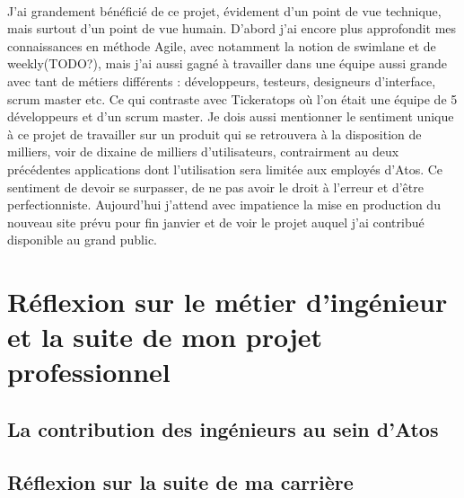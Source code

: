 \documentclass[12pt]{article}
\begin{document}
\begin {sloppypar}
\paragraph{}
J'ai grandement bénéficié de ce projet, évidement d'un point de vue technique, mais surtout d'un point 
de vue humain. D'abord j'ai encore plus approfondit mes connaissances en méthode Agile, avec notamment
la notion de swimlane et de weekly(TODO?), mais j'ai aussi gagné à travailler dans une équipe aussi grande avec 
tant de métiers différents : développeurs, testeurs, designeurs d'interface, scrum master etc. Ce qui contraste
avec Tickeratops où l'on était une équipe de 5 développeurs et d'un scrum master. Je dois aussi mentionner
le sentiment unique à ce projet de travailler sur un produit qui se retrouvera à la disposition de milliers,
voir de dixaine de milliers d'utilisateurs, contrairment au deux précédentes applications dont l'utilisation
sera limitée aux employés d'Atos. Ce sentiment de devoir se surpasser, de ne pas avoir le droit à l'erreur 
et d'être perfectionniste. Aujourd'hui j'attend avec impatience la mise en production du nouveau site 
prévu pour fin janvier et de voir le projet auquel j'ai contribué disponible au grand public.

\newpage
\section{Réflexion sur le métier d'ingénieur et la suite de mon projet professionnel}
\subsection{La contribution des ingénieurs au sein d'Atos}
\subsection{Réflexion sur la suite de ma carrière}
\end{sloppypar}
\end{document}
